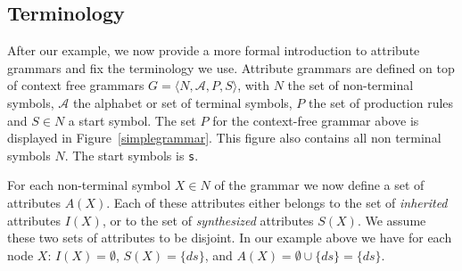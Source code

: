 \subsection{Terminology}
% 
After our example, we now provide a more formal introduction to attribute grammars and fix the terminology we use. 
%
Attribute grammars are defined on top of 
context free grammars
 $G=\langle  N, \mathcal{A}, P, S\rangle$, with $N$ the set of non-terminal symbols,  $\mathcal{A}$ the alphabet or set of terminal symbols, 
$P$ the set of production rules and $S\in N$ a start symbol. 
The set $P$ for the context-free grammar above is displayed in Figure~\ref{simplegrammar}.
This figure also contains all non terminal symbols $N$.
The start symbols is \texttt{s}.

For each non-terminal symbol $X\in N$  of the grammar we now define
 a set of attributes $A(X)$. %
%
Each of these attributes either belongs to the set of \emph{inherited} attributes $I(X)$, or to the set of \emph{synthesized} attributes $S(X)$.
We assume these two sets of attributes to be disjoint. %
In our example above we have for each node $X$: $I(X)=\emptyset$, $S(X)=\{\textit{ds}\}$, and $A(X)=\emptyset\cup\{\textit{ds}\}=\{\textit{ds}\}$.
%

